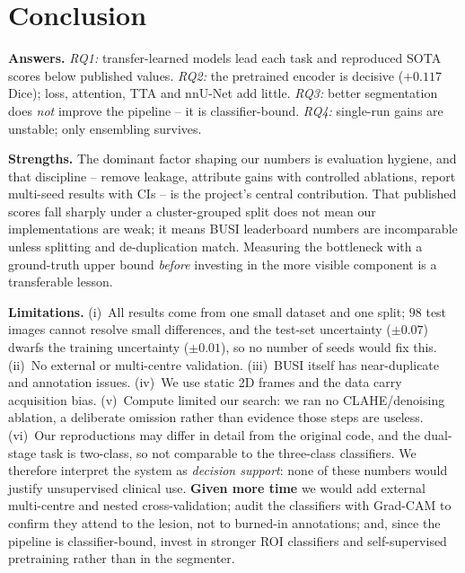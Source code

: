 \documentclass[10pt,twocolumn]{article}
\begin{document}
\section{Conclusion}
\textbf{Answers.} \emph{RQ1:} transfer-learned models lead each task and reproduced
SOTA scores below published values. \emph{RQ2:} the pretrained encoder is decisive
($+0.117$ Dice); loss, attention, TTA and nnU-Net add little. \emph{RQ3:} better
segmentation does \emph{not} improve the pipeline -- it is classifier-bound.
\emph{RQ4:} single-run gains are unstable; only ensembling survives.

\textbf{Strengths.} The dominant factor shaping our numbers is evaluation hygiene,
and that discipline -- remove leakage, attribute gains with controlled ablations,
report multi-seed results with CIs -- is the project's central contribution. That
published scores fall sharply under a cluster-grouped split does not mean our
implementations are weak; it means BUSI leaderboard numbers are incomparable unless
splitting and de-duplication match. Measuring the bottleneck with a ground-truth
upper bound \emph{before} investing in the more visible component is a transferable
lesson.

\textbf{Limitations.} (i)~All results come from one small dataset and one split;
$98$ test images cannot resolve small differences, and the test-set uncertainty
($\pm0.07$) dwarfs the training uncertainty ($\pm0.01$), so no number of seeds
would fix this. (ii)~No external or multi-centre validation. (iii)~BUSI itself has
near-duplicate and annotation issues. (iv)~We use static 2D frames and the data
carry acquisition bias. (v)~Compute limited our search: we ran no CLAHE/denoising
ablation, a deliberate omission rather than evidence those steps are useless.
(vi)~Our reproductions may differ in detail from the original code, and the
dual-stage task is two-class, so not comparable to the three-class classifiers. We
therefore interpret the system as \emph{decision support}: none of these numbers
would justify unsupervised clinical use. \textbf{Given more time} we would add
external multi-centre and nested cross-validation; audit the classifiers with
Grad-CAM to confirm they attend to the lesion, not to burned-in annotations; and,
since the pipeline is classifier-bound, invest in stronger ROI classifiers and
self-supervised pretraining rather than in the segmenter.
\end{document}
